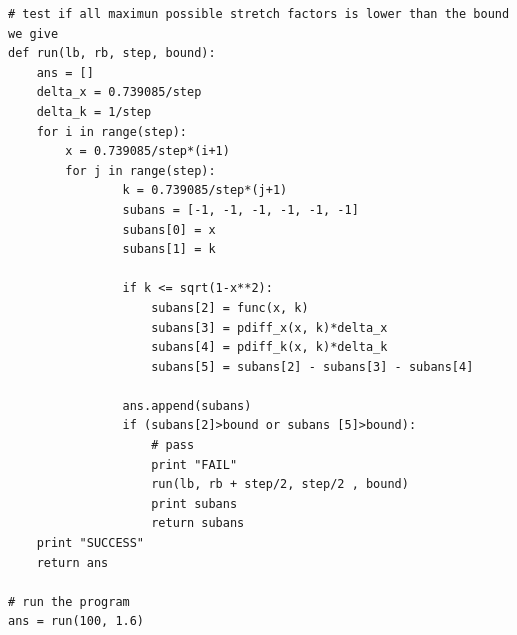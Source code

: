 \begin{verbatim}
# test if all maximun possible stretch factors is lower than the bound we give
def run(lb, rb, step, bound):
	ans = []
	delta_x = 0.739085/step
	delta_k = 1/step
	for i in range(step):
		x = 0.739085/step*(i+1)
		for j in range(step):
				k = 0.739085/step*(j+1)
				subans = [-1, -1, -1, -1, -1, -1]
				subans[0] = x
				subans[1] = k
				
				if k <= sqrt(1-x**2): 
					subans[2] = func(x, k)
					subans[3] = pdiff_x(x, k)*delta_x
					subans[4] = pdiff_k(x, k)*delta_k
					subans[5] = subans[2] - subans[3] - subans[4]

				ans.append(subans)
				if (subans[2]>bound or subans [5]>bound):
					# pass
					print "FAIL"
					run(lb, rb + step/2, step/2 , bound)
					print subans
					return subans
	print "SUCCESS"
	return ans

# run the program
ans = run(100, 1.6)

\end{verbatim}